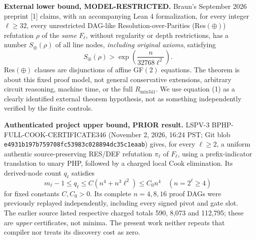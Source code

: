 \documentclass[11pt]{article}
\begin{document}
\noindent\textbf{External lower bound, MODEL-RESTRICTED.} Braun's September 2026 preprint [1] claims, with an accompanying Lean 4 formalization, for every integer $\ell\ge32$, every unrestricted DAG-like Resolution-over-Parities (Res$(\oplus)$) refutation $\rho$ of the \emph{same} $F_\ell$, without regularity or depth restrictions, has a number $S_\oplus(\rho)$ of all line nodes, \emph{including original axioms}, satisfying
\[
 S_\oplus(\rho)>\exp\!\left(\frac{n}{32768\ell^2}\right).
 \tag{1}
\]
Res$(\oplus)$ clauses are disjunctions of affine GF$(2)$ equations. The theorem is about this fixed proof model, not general conservative extensions, arbitrary circuit reasoning, machine time, or the full $R_{\mathrm{mix341}}$. We use equation (1) as a clearly identified external theorem hypothesis, not as something independently verified by the finite controls.

\noindent\textbf{Authenticated project upper bound, PRIOR result.} LSPV-3 BPHP-FULL-COOK-CERTIFICATE346 (November 2, 2026, 16:24 PST; Git blob \texttt{e4931b197b759708fc53983c028894dc35c1eaab}) gives, for every $\ell\ge2$, a uniform authentic source-preserving RES/DEF refutation $\pi_\ell$ of $F_\ell$, using a prefix-indicator translation to unary PHP, followed by a charged local Cook elimination. Its derived-node count $q_\ell$ satisfies
\[
 m_\ell-1\le q_\ell\le C(n^4+n^3\ell^2)\le C_0 n^4
 \quad(n=2^\ell\ge4)
 \tag{2}
\]
for fixed constants $C,C_0>0$. Its complete $n=4,8,16$ proof DAGs were previously replayed independently, including every signed pivot and gate slot. The earlier source listed respective charged totals 590, 8,073 and 112,795; these are \emph{upper} certificates, not minima. The present work neither repeats that compiler nor treats its discovery cost as zero.
\end{document}
